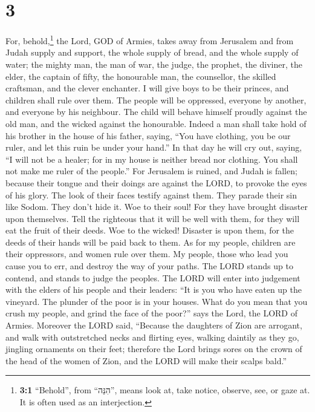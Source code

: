 \hypertarget{section-2}{%
\section{3}\label{section-2}}

 For, behold,\footnote{\textbf{3:1} ``Behold'', from
  ``הִנֵּה'', means look at, take notice, observe, see, or gaze at. It
  is often used as an interjection.} the Lord, GOD of Armies, takes away
from Jerusalem and from Judah supply and support, the whole supply of
bread, and the whole supply of water;  the mighty man, the
man of war, the judge, the prophet, the diviner, the elder,
 the captain of fifty, the honourable man, the counsellor,
the skilled craftsman, and the clever enchanter.  I will
give boys to be their princes, and children shall rule over them.
 The people will be oppressed, everyone by another, and
everyone by his neighbour. The child will behave himself proudly against
the old man, and the wicked against the honourable. 
Indeed a man shall take hold of his brother in the house of his father,
saying, ``You have clothing, you be our ruler, and let this ruin be
under your hand.''  In that day he will cry out, saying,
``I will not be a healer; for in my house is neither bread nor clothing.
You shall not make me ruler of the people.''  For
Jerusalem is ruined, and Judah is fallen; because their tongue and their
doings are against the LORD, to provoke the eyes of his glory.
 The look of their faces testify against them. They parade
their sin like Sodom. They don't hide it. Woe to their soul! For they
have brought disaster upon themselves.  Tell the
righteous that it will be well with them, for they will eat the fruit of
their deeds.  Woe to the wicked! Disaster is upon them,
for the deeds of their hands will be paid back to them. 
As for my people, children are their oppressors, and women rule over
them. My people, those who lead you cause you to err, and destroy the
way of your paths.  The LORD stands up to contend, and
stands to judge the peoples.  The LORD will enter into
judgement with the elders of his people and their leaders: ``It is you
who have eaten up the vineyard. The plunder of the poor is in your
houses.  What do you mean that you crush my people, and
grind the face of the poor?'' says the Lord, the LORD of Armies.
 Moreover the LORD said, ``Because the daughters of Zion
are arrogant, and walk with outstretched necks and flirting eyes,
walking daintily as they go, jingling ornaments on their feet;
 therefore the Lord brings sores on the crown of the head
of the women of Zion, and the LORD will make their scalps bald.''

